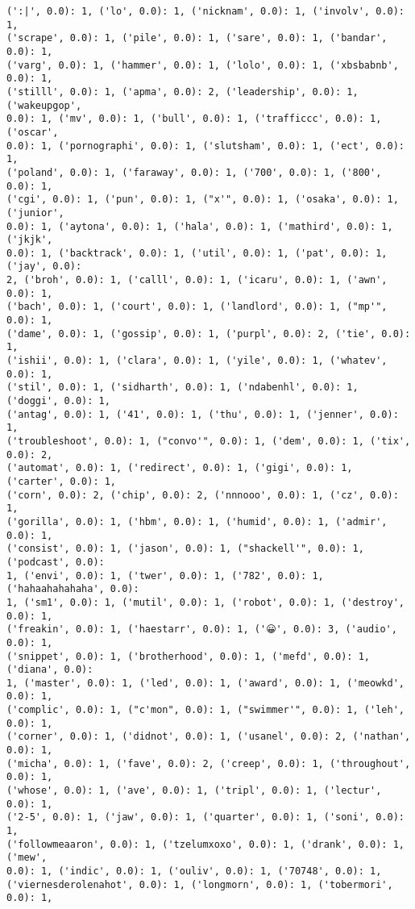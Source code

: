 \documentclass[11pt]{article}
\begin{document}
\begin{Verbatim}[commandchars=\\\{\}]
(':|', 0.0): 1, ('lo', 0.0): 1, ('nicknam', 0.0): 1, ('involv', 0.0): 1,
('scrape', 0.0): 1, ('pile', 0.0): 1, ('sare', 0.0): 1, ('bandar', 0.0): 1,
('varg', 0.0): 1, ('hammer', 0.0): 1, ('lolo', 0.0): 1, ('xbsbabnb', 0.0): 1,
('stilll', 0.0): 1, ('apma', 0.0): 2, ('leadership', 0.0): 1, ('wakeupgop',
0.0): 1, ('mv', 0.0): 1, ('bull', 0.0): 1, ('trafficcc', 0.0): 1, ('oscar',
0.0): 1, ('pornographi', 0.0): 1, ('slutsham', 0.0): 1, ('ect', 0.0): 1,
('poland', 0.0): 1, ('faraway', 0.0): 1, ('700', 0.0): 1, ('800', 0.0): 1,
('cgi', 0.0): 1, ('pun', 0.0): 1, ("x'", 0.0): 1, ('osaka', 0.0): 1, ('junior',
0.0): 1, ('aytona', 0.0): 1, ('hala', 0.0): 1, ('mathird', 0.0): 1, ('jkjk',
0.0): 1, ('backtrack', 0.0): 1, ('util', 0.0): 1, ('pat', 0.0): 1, ('jay', 0.0):
2, ('broh', 0.0): 1, ('calll', 0.0): 1, ('icaru', 0.0): 1, ('awn', 0.0): 1,
('bach', 0.0): 1, ('court', 0.0): 1, ('landlord', 0.0): 1, ("mp'", 0.0): 1,
('dame', 0.0): 1, ('gossip', 0.0): 1, ('purpl', 0.0): 2, ('tie', 0.0): 1,
('ishii', 0.0): 1, ('clara', 0.0): 1, ('yile', 0.0): 1, ('whatev', 0.0): 1,
('stil', 0.0): 1, ('sidharth', 0.0): 1, ('ndabenhl', 0.0): 1, ('doggi', 0.0): 1,
('antag', 0.0): 1, ('41', 0.0): 1, ('thu', 0.0): 1, ('jenner', 0.0): 1,
('troubleshoot', 0.0): 1, ("convo'", 0.0): 1, ('dem', 0.0): 1, ('tix', 0.0): 2,
('automat', 0.0): 1, ('redirect', 0.0): 1, ('gigi', 0.0): 1, ('carter', 0.0): 1,
('corn', 0.0): 2, ('chip', 0.0): 2, ('nnnooo', 0.0): 1, ('cz', 0.0): 1,
('gorilla', 0.0): 1, ('hbm', 0.0): 1, ('humid', 0.0): 1, ('admir', 0.0): 1,
('consist', 0.0): 1, ('jason', 0.0): 1, ("shackell'", 0.0): 1, ('podcast', 0.0):
1, ('envi', 0.0): 1, ('twer', 0.0): 1, ('782', 0.0): 1, ('hahaahahahaha', 0.0):
1, ('sm1', 0.0): 1, ('mutil', 0.0): 1, ('robot', 0.0): 1, ('destroy', 0.0): 1,
('freakin', 0.0): 1, ('haestarr', 0.0): 1, ('😀', 0.0): 3, ('audio', 0.0): 1,
('snippet', 0.0): 1, ('brotherhood', 0.0): 1, ('mefd', 0.0): 1, ('diana', 0.0):
1, ('master', 0.0): 1, ('led', 0.0): 1, ('award', 0.0): 1, ('meowkd', 0.0): 1,
('complic', 0.0): 1, ("c'mon", 0.0): 1, ("swimmer'", 0.0): 1, ('leh', 0.0): 1,
('corner', 0.0): 1, ('didnot', 0.0): 1, ('usanel', 0.0): 2, ('nathan', 0.0): 1,
('micha', 0.0): 1, ('fave', 0.0): 2, ('creep', 0.0): 1, ('throughout', 0.0): 1,
('whose', 0.0): 1, ('ave', 0.0): 1, ('tripl', 0.0): 1, ('lectur', 0.0): 1,
('2-5', 0.0): 1, ('jaw', 0.0): 1, ('quarter', 0.0): 1, ('soni', 0.0): 1,
('followmeaaron', 0.0): 1, ('tzelumxoxo', 0.0): 1, ('drank', 0.0): 1, ('mew',
0.0): 1, ('indic', 0.0): 1, ('ouliv', 0.0): 1, ('70748', 0.0): 1,
('viernesderolenahot', 0.0): 1, ('longmorn', 0.0): 1, ('tobermori', 0.0): 1,

\end{Verbatim}
\end{document}
